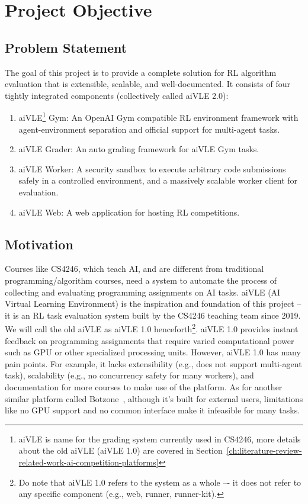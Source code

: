 \chapter{Project Objective}
\label{ch:project-objective}
\section{Problem Statement}
\label{s:project-objective-problem-statement}
The goal of this project is to provide a complete solution for RL algorithm evaluation that is extensible, scalable, and well-documented. It consists of four tightly integrated components (collectively called aiVLE 2.0):

\begin{enumerate}
    \item aiVLE\footnote{aiVLE is name for the grading system currently used in CS4246, more details about the old aiVLE (aiVLE 1.0) are covered in Section~\ref{ch:literature-review-related-work-ai-competition-platforms}} Gym: An OpenAI Gym \cite{openai-gym} compatible RL environment framework with agent-environment separation and official support for multi-agent tasks.
    \item aiVLE Grader: An auto grading framework for aiVLE Gym tasks.
    \item aiVLE Worker: A security sandbox to execute arbitrary code submissions safely in a controlled environment, and a massively scalable worker client for evaluation.
    \item aiVLE Web: A web application for hosting RL competitions.
\end{enumerate}

\section{Motivation}
\label{s:project-objective-motivation}
Courses like CS4246, which teach AI, and are different from traditional programming/algorithm courses, need a system to automate the process of collecting and evaluating programming assignments on AI tasks. aiVLE (AI Virtual Learning Environment) is the inspiration and foundation of this project – it is an RL task evaluation system built by the CS4246 teaching team since 2019. We will call the old aiVLE as aiVLE 1.0 henceforth\footnote{Do note that aiVLE 1.0 refers to the system as a whole –- it does not refer to any specific component (e.g., web, runner, runner-kit).}. aiVLE 1.0 provides instant feedback on programming assignments that require varied computational power such as GPU or other specialized processing units. However, aiVLE 1.0 has many pain points. For example, it lacks extensibility (e.g., does not support multi-agent task), scalability (e.g., no concurrency safety for many workers), and documentation for more courses to make use of the platform. As for another similar platform called Botzone~\cite{botzone}, although it’s built for external users, limitations like no GPU support and no common interface make it infeasible for many tasks.

